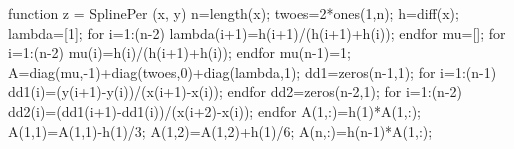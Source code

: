 \documentclass[11pt,spanish,]{article}
\newenvironment{Shaded}{}{}
\newcommand{\BaseNTok}[1]{\textcolor[rgb]{0.25,0.63,0.44}{{#1}}}
\newcommand{\FloatTok}[1]{\textcolor[rgb]{0.25,0.63,0.44}{{#1}}}
\newcommand{\FunctionTok}[1]{\textcolor[rgb]{0.02,0.16,0.49}{{#1}}}
\newcommand{\NormalTok}[1]{{#1}}
\theoremstyle{definition} \newtheorem*{definicion}{Definición}
\begin{document}
\begin{Shaded}
\begin{Highlighting}[]
\NormalTok{function z = SplinePer (x, y)}
        \NormalTok{n=}\FunctionTok{length}\NormalTok{(x);}
        \NormalTok{twoes=}\FloatTok{2}\NormalTok{*}\FunctionTok{ones}\NormalTok{(}\FloatTok{1}\NormalTok{,n);}
        \NormalTok{h=}\FunctionTok{diff}\NormalTok{(x);}
        \NormalTok{lambda=[}\FloatTok{1}\NormalTok{];}
        \NormalTok{for }\BaseNTok{i}\NormalTok{=}\FloatTok{1}\NormalTok{:(n-}\FloatTok{2}\NormalTok{)}
                \NormalTok{lambda(}\BaseNTok{i}\NormalTok{+}\FloatTok{1}\NormalTok{)=h(}\BaseNTok{i}\NormalTok{+}\FloatTok{1}\NormalTok{)/(h(}\BaseNTok{i}\NormalTok{+}\FloatTok{1}\NormalTok{)+h(}\BaseNTok{i}\NormalTok{));}
        \NormalTok{endfor}
        \NormalTok{mu=[];}
        \NormalTok{for }\BaseNTok{i}\NormalTok{=}\FloatTok{1}\NormalTok{:(n-}\FloatTok{2}\NormalTok{)}
                \NormalTok{mu(}\BaseNTok{i}\NormalTok{)=h(}\BaseNTok{i}\NormalTok{)/(h(}\BaseNTok{i}\NormalTok{+}\FloatTok{1}\NormalTok{)+h(}\BaseNTok{i}\NormalTok{));}
        \NormalTok{endfor}
        \NormalTok{mu(n-}\FloatTok{1}\NormalTok{)=}\FloatTok{1}\NormalTok{;}
        \NormalTok{A=}\FunctionTok{diag}\NormalTok{(mu,-}\FloatTok{1}\NormalTok{)+}\FunctionTok{diag}\NormalTok{(twoes,}\FloatTok{0}\NormalTok{)+}\FunctionTok{diag}\NormalTok{(lambda,}\FloatTok{1}\NormalTok{);}
        \NormalTok{dd1=}\FunctionTok{zeros}\NormalTok{(n-}\FloatTok{1}\NormalTok{,}\FloatTok{1}\NormalTok{);}
        \NormalTok{for }\BaseNTok{i}\NormalTok{=}\FloatTok{1}\NormalTok{:(n-}\FloatTok{1}\NormalTok{)}
                \NormalTok{dd1(}\BaseNTok{i}\NormalTok{)=(y(}\BaseNTok{i}\NormalTok{+}\FloatTok{1}\NormalTok{)-y(}\BaseNTok{i}\NormalTok{))/(x(}\BaseNTok{i}\NormalTok{+}\FloatTok{1}\NormalTok{)-x(}\BaseNTok{i}\NormalTok{));}
        \NormalTok{endfor}
        \NormalTok{dd2=}\FunctionTok{zeros}\NormalTok{(n-}\FloatTok{2}\NormalTok{,}\FloatTok{1}\NormalTok{);}
        \NormalTok{for }\BaseNTok{i}\NormalTok{=}\FloatTok{1}\NormalTok{:(n-}\FloatTok{2}\NormalTok{)}
                \NormalTok{dd2(}\BaseNTok{i}\NormalTok{)=(dd1(}\BaseNTok{i}\NormalTok{+}\FloatTok{1}\NormalTok{)-dd1(}\BaseNTok{i}\NormalTok{))/(x(}\BaseNTok{i}\NormalTok{+}\FloatTok{2}\NormalTok{)-x(}\BaseNTok{i}\NormalTok{));}
        \NormalTok{endfor}
   \NormalTok{A(}\FloatTok{1}\NormalTok{,:)=h(}\FloatTok{1}\NormalTok{)*A(}\FloatTok{1}\NormalTok{,:);}
   \NormalTok{A(}\FloatTok{1}\NormalTok{,}\FloatTok{1}\NormalTok{)=A(}\FloatTok{1}\NormalTok{,}\FloatTok{1}\NormalTok{)-h(}\FloatTok{1}\NormalTok{)/}\FloatTok{3}\NormalTok{;}
   \NormalTok{A(}\FloatTok{1}\NormalTok{,}\FloatTok{2}\NormalTok{)=A(}\FloatTok{1}\NormalTok{,}\FloatTok{2}\NormalTok{)+h(}\FloatTok{1}\NormalTok{)/}\FloatTok{6}\NormalTok{;}
   \NormalTok{A(n,:)=h(n-}\FloatTok{1}\NormalTok{)*A(}\FloatTok{1}\NormalTok{,:);}


\end{Highlighting}
\end{Shaded}
\end{document}
